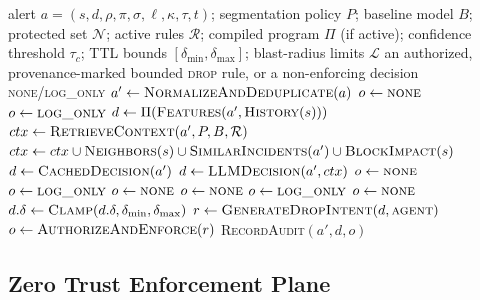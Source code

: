 \documentclass[final,5p]{elsarticle}
\begin{document}
\begin{algorithm}[t]
\caption{Fail-closed bounded-isolation decision}
\label{alg:decision}
\small
\begin{algorithmic}[1]
\Require alert $a=(s,d,\rho,\pi,\sigma,\ell,\kappa,\tau,t)$; segmentation policy $P$; baseline model $B$; protected set $\mathcal{N}$; active rules $\mathcal{R}$; compiled program $\Pi$ (if active); confidence threshold $\tau_c$; TTL bounds $[\delta_{\min},\delta_{\max}]$; blast-radius limits $\mathcal{L}$
\Ensure an authorized, provenance-marked bounded \textsc{drop} rule, or a non-enforcing decision \textsc{none}/\textsc{log\_only}
\State $a' \gets \textsc{NormalizeAndDeduplicate}(a)$
    \State $o \gets \textsc{none}$
    \State $o \gets \textsc{log\_only}$
\Else
    \State $d \gets \Pi(\textsc{Features}(a',\textsc{History}(s)))$ 
     
        \State $ctx \gets \textsc{RetrieveContext}(a',P,B,\mathcal{R})$
        \State $ctx \gets ctx \cup \textsc{Neighbors}(s) \cup \textsc{SimilarIncidents}(a') \cup \textsc{BlockImpact}(s)$
            \State $d \gets \textsc{CachedDecision}(a')$
        \Else
            \State $d \gets \textsc{LLMDecision}(a',ctx)$
        \EndIf
    \EndIf
        \State $o \gets \textsc{none}$
        \State $o \gets \textsc{log\_only}$
        \State $o \gets \textsc{none}$
        \State $o \gets \textsc{none}$
        \State $o \gets \textsc{log\_only}$
        \State $o \gets \textsc{none}$
    \Else
        \State $d.\delta \gets \textsc{Clamp}(d.\delta,\delta_{\min},\delta_{\max})$
        \State $r \gets \textsc{GenerateDropIntent}(d,\textsc{agent})$
        \State $o \gets \textsc{AuthorizeAndEnforce}(r)$
    \EndIf
\EndIf
\State \textsc{RecordAudit}$(a',d,o)$
\end{algorithmic}
\end{algorithm}

\subsection{Zero Trust Enforcement Plane}
\label{sec:enforcement_plane}
\end{document}
